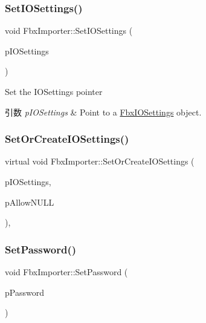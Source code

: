 \subsubsection{\texorpdfstring{Set\+I\+O\+Settings()}{SetIOSettings()}}
{\footnotesize\ttfamily void Fbx\+Importer\+::\+Set\+I\+O\+Settings (\begin{DoxyParamCaption}\item[{\hyperlink{class_fbx_i_o_settings}{Fbx\+I\+O\+Settings} $\ast$}]{p\+I\+O\+Settings }\end{DoxyParamCaption})}

Set the I\+O\+Settings pointer 
\begin{DoxyParams}{引数}
{\em p\+I\+O\+Settings} & Point to a \hyperlink{class_fbx_i_o_settings}{Fbx\+I\+O\+Settings} object. \\
\hline
\end{DoxyParams}
\mbox{\label{class_fbx_importer_a9d2169ad70921ff3f8c4a944fdd214df}} 
\subsubsection{\texorpdfstring{Set\+Or\+Create\+I\+O\+Settings()}{SetOrCreateIOSettings()}}
{\footnotesize\ttfamily virtual void Fbx\+Importer\+::\+Set\+Or\+Create\+I\+O\+Settings (\begin{DoxyParamCaption}\item[{\hyperlink{class_fbx_i_o_settings}{Fbx\+I\+O\+Settings} $\ast$}]{p\+I\+O\+Settings,  }\item[{bool}]{p\+Allow\+N\+U\+LL }\end{DoxyParamCaption})\hspace{0.3cm}{\ttfamily [protected]}, {\ttfamily [virtual]}}

\mbox{\label{class_fbx_importer_a4e3bba6f851555a94ba1eef1030b6503}} 
\subsubsection{\texorpdfstring{Set\+Password()}{SetPassword()}}
{\footnotesize\ttfamily void Fbx\+Importer\+::\+Set\+Password (\begin{DoxyParamCaption}\item[{char $\ast$}]{p\+Password }\end{DoxyParamCaption})}

